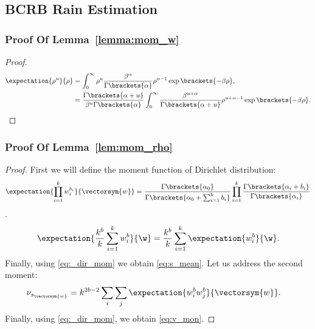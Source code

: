 \subsection{BCRB Rain Estimation}
\subsubsection{Proof Of Lemma~\ref{lemma:mom_w}}
\begin{proof}
    \begin{align}
        \expectation{\rho^{u}}{\rho}&=\int_{0}^{\infty}\rho^{u}\frac{\beta^\alpha}{\Gamma\brackets{\alpha}}\rho^{\alpha-1}\exp\brackets{-\beta\rho},\nonumber\\
        &=\frac{\Gamma\brackets{\alpha+u}}{\beta^{u}\Gamma\brackets{\alpha}}\int_{0}^{\infty}\frac{\beta^{u+\alpha}}{\Gamma\brackets{\alpha+u}}\rho^{u+\alpha-1}\exp\brackets{-\beta\rho}.
    \end{align}
\end{proof}
\subsubsection{Proof Of Lemma~\ref{lem:mom_rho}}
\begin{proof}
    First we will define the moment function of Dirichlet distribution:
    \begin{equation}\label{eq:_dir_mom}
        \expectation{\prod_{i=1}^k w_i^{b_i}}{\vectorsym{w}}=\frac{\Gamma\brackets{\alpha_0}}{\Gamma\brackets{\alpha_0+\sum_{i=1}^k b_i}}\prod_{i=1}^k\frac{\Gamma\brackets{\alpha_i+b_i}}{\Gamma\brackets{\alpha_i}}
    \end{equation}.
    \begin{align}
        \expectation{\frac{k^b}{k}\sum_{i=1}^k w_i^b}{\w}=\frac{k^b}{k}\sum_{i=1}^k\expectation{ w_i^b}{\w}.
    \end{align}
    Finally, using \eqref{eq:_dir_mom} we obtain \eqref{eq:s_mean}. Let us address the second moment:
    \begin{align}
        &\nu_{s_{\vectorsym{w}}}=k^{2b-2}\sum_i\sum_j \expectation{w_i^b w_j^b}{\vectorsym{w}}.
    \end{align}
    Finally, using \eqref{eq:_dir_mom}, we obtain \eqref{eq:v_mon}.
\end{proof}